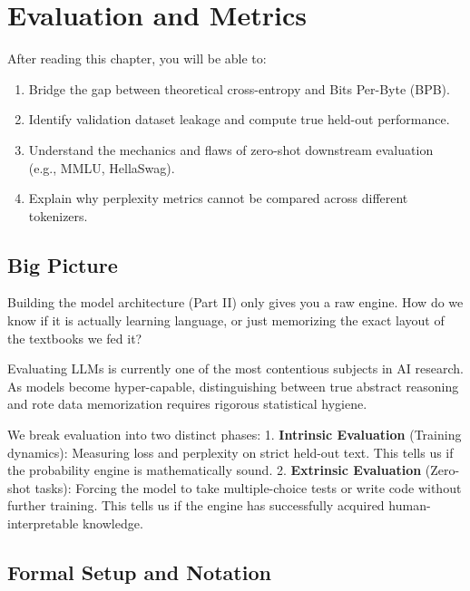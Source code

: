 \chapter{Evaluation and Metrics}
\label{ch:13}

\begin{keyinsight}
After reading this chapter, you will be able to:
\begin{enumerate}
  \item Bridge the gap between theoretical cross-entropy and Bits Per-Byte (BPB).
  \item Identify validation dataset leakage and compute true held-out performance.
  \item Understand the mechanics and flaws of zero-shot downstream evaluation (e.g., MMLU, HellaSwag).
  \item Explain why perplexity metrics cannot be compared across different tokenizers.
\end{enumerate}
\end{keyinsight}

\section{Big Picture}
\label{ch:13:sec:big_picture}

Building the model architecture (Part II) only gives you a raw engine. How do we know if it is actually learning language, or just memorizing the exact layout of the textbooks we fed it? 

Evaluating LLMs is currently one of the most contentious subjects in AI research. As models become hyper-capable, distinguishing between true abstract reasoning and rote data memorization requires rigorous statistical hygiene. 

We break evaluation into two distinct phases:
1. \textbf{Intrinsic Evaluation} (Training dynamics): Measuring loss and perplexity on strict held-out text. This tells us if the probability engine is mathematically sound.
2. \textbf{Extrinsic Evaluation} (Zero-shot tasks): Forcing the model to take multiple-choice tests or write code without further training. This tells us if the engine has successfully acquired human-interpretable knowledge.

\section{Formal Setup and Notation}
\label{ch:13:sec:setup}


